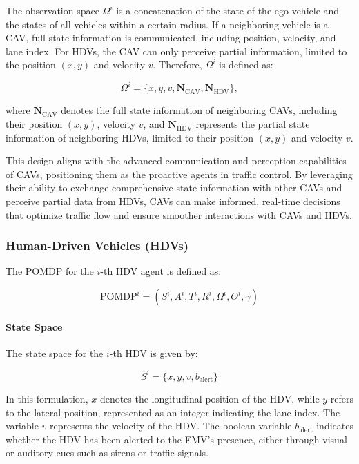 The observation space \(\Omega^i\) is a concatenation of the state of the ego vehicle and the states of all vehicles within a certain radius. If a neighboring vehicle is a CAV, full state information is communicated, including position, velocity, and lane index. For HDVs, the CAV can only perceive partial information, limited to the position \((x, y)\) and velocity \(v\). Therefore, \(\Omega^i\) is defined as:

\[
\Omega^i = \{ x, y, v, \mathbf{N}_{\text{CAV}}, \mathbf{N}_{\text{HDV}} \},
\]

where \(\mathbf{N}_{\text{CAV}}\) denotes the full state information of neighboring CAVs, including their position \((x, y)\), velocity \(v\), and \(\mathbf{N}_{\text{HDV}}\) represents the partial state information of neighboring HDVs, limited to their position \((x, y)\) and velocity \(v\).

This design aligns with the advanced communication and perception capabilities of CAVs, positioning them as the proactive agents in traffic control. By leveraging their ability to exchange comprehensive state information with other CAVs and perceive partial data from HDVs, CAVs can make informed, real-time decisions that optimize traffic flow and ensure smoother interactions with CAVs and HDVs. 
\subsubsection{Human-Driven Vehicles (HDVs)}
The POMDP for the \(i\)-th HDV agent is defined as:

\begin{equation}
\text{POMDP}^i = \left( S^i, A^i, T^i, R^i, \Omega^i, O^i, \gamma \right)
\end{equation}

\paragraph{State Space}
The state space for the \(i\)-th HDV is given by:

\begin{equation}
S^i = \{x, y, v, b_{\text{alert}}\}
\end{equation}

In this formulation, \(x\) denotes the longitudinal position of the HDV, while \(y\) refers to the lateral position, represented as an integer indicating the lane index. The variable \(v\) represents the velocity of the HDV. The boolean variable \(b_{\text{alert}}\) indicates whether the HDV has been alerted to the EMV’s presence, either through visual or auditory cues such as sirens or traffic signals.

